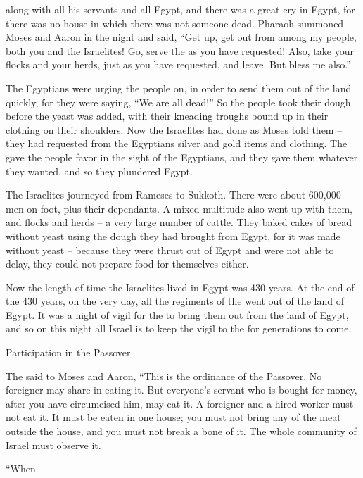 {along with all
his servants
and all
Egypt,
and there was
a great
cry
in Egypt,
for
there was no
house
in which
there
was not
someone dead.
Pharaoh summoned
Moses
and Aaron
in the night
and said,
“Get
up, get out
from among
my people,
both
you
and the Israelites! Go,
serve
the {}
as you have requested!
Also,
take
your flocks
and your herds,
just
as you have requested,
and leave.
But bless
me also.”
\par }{\PP {}The Egyptians
were urging
the people
on,
in order to send
them out
of the land
quickly,
for
they were saying,
“We are all
dead!”
So the people
took
their dough
before
the yeast was added,
with their kneading troughs
bound up
in their clothing
on
their shoulders.
Now the Israelites
had done
as Moses
told them – they had requested from the Egyptians silver and gold items and clothing.
The
{}
gave
the
people
favor
in the sight
of the Egyptians,
and they gave them
whatever they wanted,
and so they plundered
Egypt.
\par }{\PP {}The Israelites
journeyed
from Rameses
to Sukkoth.
There were about 600,000
men
on foot,
plus their dependants.
A mixed multitude
also
went up
with
them, and flocks
and herds
– a very
large
number of cattle.
They baked
cakes
of bread without yeast
using the dough
they had
brought
from Egypt,
for
it was made without
yeast
– because
they were thrust out
of Egypt
and were not
able
to delay,
they could not
prepare
food for themselves either.
\par }{\PP {}Now the length
of time the Israelites
lived
in Egypt
was 430
years.
At the end
of the 430
years,
on the very
day,
all
the regiments
of the {}
went out
of the land
of Egypt.
It was
a night
of vigil
for the
{}
to bring them out
from the land
of Egypt,
and so on this
night
all
Israel
is to keep the vigil
to the
{}
for generations to come.
\par }{\SH Participation in the Passover
\par }{\PP {}The
{}
said
to
Moses
and Aaron,
“This
is the ordinance
of the Passover.
No
foreigner
may share in eating it.
But everyone’s
servant
who is bought
for money,
after you have circumcised
him,
may eat it.
A foreigner
and a hired worker
must not
eat it.
It must be eaten
in one
house;
you must not
bring
any
of the meat
outside
the house,
and you must not
break
a bone of it.
The whole
community
of Israel
must observe it.
\par }{\PP {}“When
}
